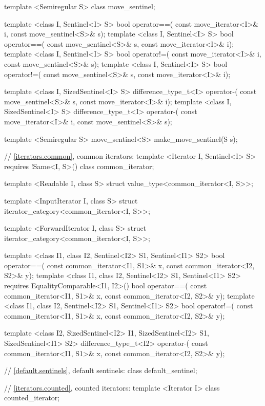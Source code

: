 \begin{codeblock}
{{{{  template <Semiregular S> class move_sentinel;

  template <class I, Sentinel<I> S>
    bool operator==(
      const move_iterator<I>& i, const move_sentinel<S>& s);
  template <class I, Sentinel<I> S>
    bool operator==(
      const move_sentinel<S>& s, const move_iterator<I>& i);
  template <class I, Sentinel<I> S>
    bool operator!=(
      const move_iterator<I>& i, const move_sentinel<S>& s);
  template <class I, Sentinel<I> S>
    bool operator!=(
      const move_sentinel<S>& s, const move_iterator<I>& i);

  template <class I, SizedSentinel<I> S>
    difference_type_t<I> operator-(
      const move_sentinel<S>& s, const move_iterator<I>& i);
  template <class I, SizedSentinel<I> S>
    difference_type_t<I> operator-(
      const move_iterator<I>& i, const move_sentinel<S>& s);

  template <Semiregular S>
    move_sentinel<S> make_move_sentinel(S s);

  // \ref{iterators.common}, common iterators:
  template <Iterator I, Sentinel<I> S>
    requires !Same<I, S>()
  class common_iterator;

  template <Readable I, class S>
  struct value_type<common_iterator<I, S>>;

  template <InputIterator I, class S>
  struct iterator_category<common_iterator<I, S>>;

  template <ForwardIterator I, class S>
  struct iterator_category<common_iterator<I, S>>;

  template <class I1, class I2, Sentinel<I2> S1, Sentinel<I1> S2>
  bool operator==(
    const common_iterator<I1, S1>& x, const common_iterator<I2, S2>& y);
  template <class I1, class I2, Sentinel<I2> S1, Sentinel<I1> S2>
    requires EqualityComparable<I1, I2>()
  bool operator==(
    const common_iterator<I1, S1>& x, const common_iterator<I2, S2>& y);
  template <class I1, class I2, Sentinel<I2> S1, Sentinel<I1> S2>
  bool operator!=(
    const common_iterator<I1, S1>& x, const common_iterator<I2, S2>& y);

  template <class I2, SizedSentinel<I2> I1, SizedSentinel<I2> S1, SizedSentinel<I1> S2>
  difference_type_t<I2> operator-(
    const common_iterator<I1, S1>& x, const common_iterator<I2, S2>& y);

  // \ref{default.sentinels}, default sentinels:
  class default_sentinel;

  // \ref{iterators.counted}, counted iterators:
  template <Iterator I> class counted_iterator;

}}}}
\end{codeblock}
